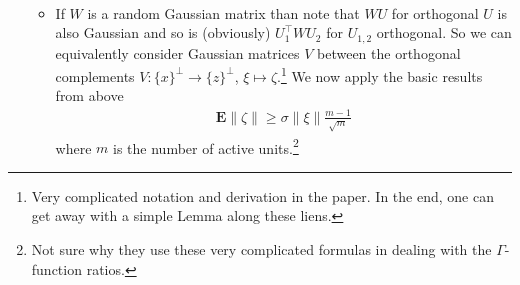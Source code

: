 \documentclass{article}
\newcommand{\E}{{\mathbf E}}
\begin{document}
\begin{enumerate}
\begin{itemize}
\begin{align}
\end{align}
\item If $W$ is a random Gaussian matrix than note that $W U$ for orthogonal $U$ is also Gaussian and so is (obviously) $U_1^\top W U_2$ for $U_{1,2}$ orthogonal. So we can equivalently consider Gaussian matrices $V$ between the orthogonal complements $V: \{x\}^\perp \to \{z\}^\perp$, $\xi \mapsto \zeta$.\footnote{Very complicated notation and derivation in the paper. In the end, one can  get away with a simple Lemma along these liens.} We now apply the basic results from above
\begin{align}
\E \| \zeta\| \ge \sigma  \| \xi\|  \frac{m-1}{\sqrt m}
\end{align}
where $m$ is the number of active units.\footnote{Not sure why they use these very complicated formulas in dealing with the $\Gamma$-function ratios.} %
\end{itemize}
\end{enumerate}
\end{document}

